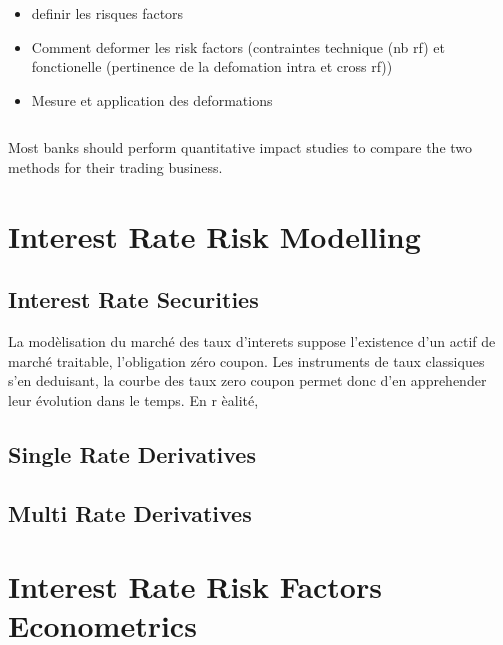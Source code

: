 \documentclass[3pt]{article}
\begin{document}
\begin{itemize}
\item definir les risques factors

\item Comment deformer les risk factors (contraintes technique (nb rf) et
fonctionelle (pertinence de la defomation intra et cross rf))

\item Mesure et application des deformations
\end{itemize}

$\ \ \ \ \ $

Most banks should perform quantitative impact studies to compare the two
methods for their trading business.

\section{Interest Rate Risk Modelling}

\subsection{Interest Rate Securities}

La mod\`{e}lisation du march\'{e} des taux d'interets suppose l'existence
d'un actif de march\'{e} traitable, l'obligation z\'{e}ro coupon. Les
instruments de taux classiques s'en deduisant, la courbe des taux zero
coupon permet donc d'en apprehender leur \'{e}volution dans le temps. En r%
\`{e}alit\'{e},

\bigskip

\subsection{Single Rate Derivatives}

\subsection{Multi Rate Derivatives}

\bigskip

\bigskip

\bigskip

\bigskip

\bigskip

\bigskip

\bigskip

\bigskip

\section{Interest Rate Risk Factors Econometrics}
\end{document}
